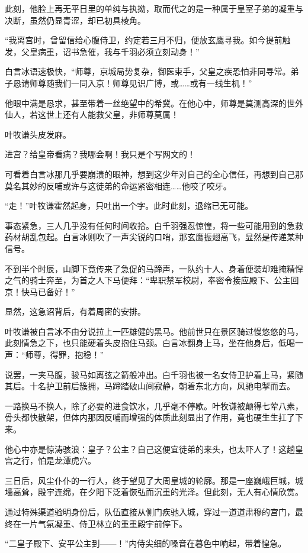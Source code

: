 此刻，他脸上再无平日里的单纯与执拗，取而代之的是一种属于皇室子弟的凝重与决断，虽然仍显青涩，却已初具棱角。

“我离宫时，曾留信给心腹侍卫，约定若三月不归，便放玄鹰寻我。如今提前触发，父皇病重，诏书急催，我与千羽必须立刻动身！”

白言冰语速极快，“师尊，京城局势复杂，御医束手，父皇之疾恐怕非同寻常。弟子恳请师尊随我们一同入京！师尊见识广博，或……或有一线生机！”

他眼中满是恳求，甚至带着一丝绝望中的希冀。在他心中，师尊是莫测高深的世外仙人，若这世上还有人能救父皇，非师尊莫属！

叶牧谦头皮发麻。

进宫？给皇帝看病？我哪会啊！我只是个写网文的！

可看着白言冰那几乎要崩溃的眼神，想到这少年对自己的全心信任，再想到自己那莫名其妙的反哺或许与这徒弟的命运紧密相连……他咬了咬牙。

“走！”叶牧谦霍然起身，只吐出一个字。此时此刻，退缩已无可能。

事态紧急，三人几乎没有任何时间收拾。白千羽强忍惊惶，将一些可能用到的急救药材胡乱包起。白言冰则吹了一声尖锐的口哨，那玄鹰振翅高飞，显然是传递某种信号。

不到半个时辰，山脚下竟传来了急促的马蹄声，一队约十人、身着便装却难掩精悍之气的骑士奔至，为首之人下马便拜：“卑职禁军校尉，奉密令接应殿下、公主回京！快马已备好！”

显然，这急诏背后，有着周密的安排。

叶牧谦被白言冰不由分说拉上一匹雄健的黑马。他前世只在景区骑过慢悠悠的马，此刻情急之下，也只能硬着头皮抱住马颈。白言冰翻身上马，坐在他身后，低喝一声：“师尊，得罪，抱稳！”

说罢，一夹马腹，骏马如离弦之箭般冲出。白千羽也被一名女侍卫护着上马，紧随其后。十名护卫前后簇拥，马蹄踏破山间寂静，朝着东北方向，风驰电掣而去。

一路换马不换人，除了必要的进食饮水，几乎毫不停歇。叶牧谦被颠得七荤八素，骨头都快散架，但体内那因反哺而增强的体质此刻显出了作用，竟也硬生生扛了下来。

他心中亦是惊涛骇浪：皇子？公主？自己这便宜徒弟的来头，也太吓人了！这趟皇宫之行，怕是龙潭虎穴。

三日后，风尘仆仆的一行人，终于望见了大周皇城的轮廓。那是一座巍峨巨城，城墙高耸，殿宇连绵，在夕阳下泛着恢弘而沉重的光泽。但此刻，无人有心情欣赏。

通过特殊渠道验明身份后，队伍直接从侧门疾驰入城，穿过一道道肃穆的宫门，最终在一片气氛凝重、侍卫林立的重重殿宇前停下。

“二皇子殿下、安平公主到——！”内侍尖细的嗓音在暮色中响起，带着惶急。

